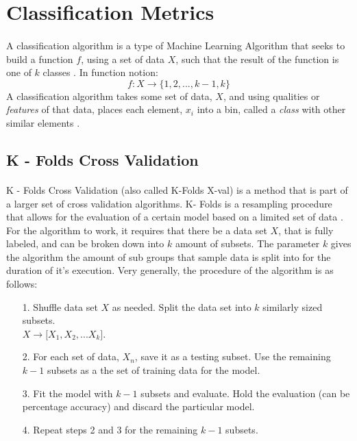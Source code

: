 \documentclass[12pt,letterpaper]{article}
\begin{document}

\section{Classification Metrics}
\paragraph*{}A classification algorithm is a type of Machine Learning Algorithm that seeks to build a function $f$, using a set of data $X$, such that the result of the function is one of $k$ classes \cite{Petrik}. In function notion:
\begin{equation}
\label{classification function}
f: X \rightarrow \{1,2,...,k-1,k\}
\end{equation}
A classification algorithm takes some set of data, $X$, and using qualities or \textit{features} of that data, places each element, $x_i$ into a bin, called a \textit{class} with other similar elements \cite{Geron}. 


\subsection{K - Folds Cross Validation}
\paragraph*{} K - Folds Cross Validation (also called K-Folds X-val) is a method that is part of a larger set of cross validation algorithms. K- Folds is a resampling procedure that allows for the evaluation of a certain model based on a limited set of data \cite{Brownlee}. For the algorithm to work, it requires that there be a data set $X$, that is fully labeled, and can be broken down into $k$ amount of subsets. The parameter $k$ gives the algorithm the amount of sub groups that sample data is split into for the duration of it's execution. Very generally, the procedure of the algorithm is as follows:
\begin{enumerate}
\item[1.]Shuffle data set $X$ as needed. Split the data set into $k$ similarly sized subsets. \\$X \rightarrow \big[ X_1 , X_2 , ... X_k \big]$.
\item[2.]For each set of data, $X_n$, save it as a testing subset. Use the remaining $k-1$ subsets as a the set of training data for the model.
\item[3.]Fit the model with $k-1$ subsets and evaluate. Hold the evaluation (can be percentage accuracy) and discard the particular model.
\item[4.]Repeat steps 2 and 3 for the remaining $k-1$ subsets.
\end{enumerate}
\end{document}
